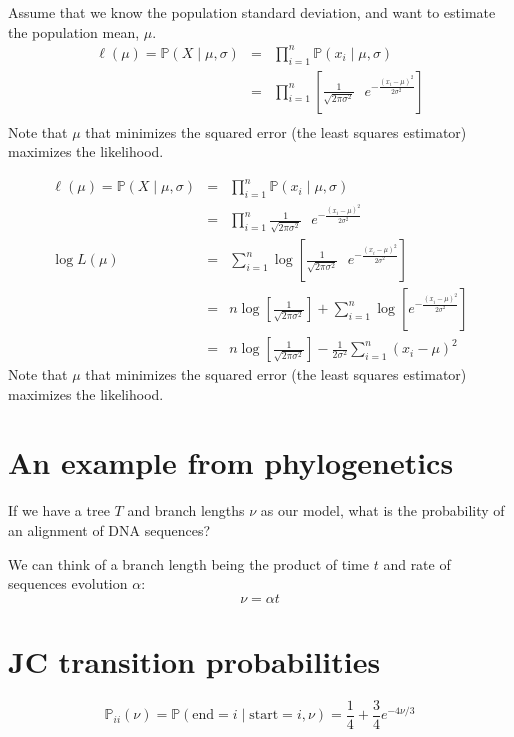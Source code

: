 \documentclass[landscape]{foils}
\renewcommand{\Pr}{\mathbb{P}}
\begin{document}
Assume that we know the population standard deviation, and want to estimate
    the population mean, $\mu$.\\

\myNewSlide
\begin{eqnarray*}
  \ell(\mu) = \Pr(X \mid \mu, \sigma) & = & \prod_{i=1}^n\Pr(x_i \mid \mu, \sigma) \\
  & = &  \prod_{i=1}^n\left[\frac{1}{\sqrt{2\pi\sigma^2}}\mbox{ }e^{-\frac{\left(x_i-\mu\right)^2}{2\sigma^2}} \right]\\
\end{eqnarray*}
Note that $\mu$ that minimizes the squared error (the least squares estimator) maximizes the likelihood.

\myNewSlide
\begin{eqnarray*}
  \ell(\mu) = \Pr(X \mid \mu, \sigma) & = & \prod_{i=1}^n\Pr(x_i \mid \mu, \sigma) \\
  & = &  \prod_{i=1}^n\frac{1}{\sqrt{2\pi\sigma^2}}\mbox{ }e^{-\frac{\left(x_i-\mu\right)^2}{2\sigma^2}} \\
\log L(\mu)  & = &  \sum_{i=1}^n\log\left[\frac{1}{\sqrt{2\pi\sigma^2}}\mbox{ }e^{-\frac{\left(x_i-\mu\right)^2}{2\sigma^2}}\right] \\
& = &  n \log\left[\frac{1}{\sqrt{2\pi\sigma^2}}\right] + \sum_{i=1}^n\log\left[e^{-\frac{\left(x_i-\mu\right)^2}{2\sigma^2}}\right] \\
& = &  n \log\left[\frac{1}{\sqrt{2\pi\sigma^2}}\right] - \frac{1}{2\sigma^2} \sum_{i=1}^n\left(x_i-\mu\right)^2
\end{eqnarray*}
Note that $\mu$ that minimizes the squared error (the least squares estimator) maximizes the likelihood.

\myNewSlide
\section*{An example from phylogenetics}

If we have a tree $T$ and branch lengths $\nu$ as our model, what is the probability of 
an alignment of DNA sequences?

We can think of a branch length being the product of time $t$ and rate of sequences evolution $\alpha$:
$$\nu = \alpha t$$






\myNewSlide
\section*{JC transition probabilities}
$$\Pr_{ii}(\nu) = \Pr(\mbox{end}= i \mid \mbox{start}=i, \nu) = \frac{1}{4} + \frac{3}{4}e^{-4\nu/3}$$
\end{document}
